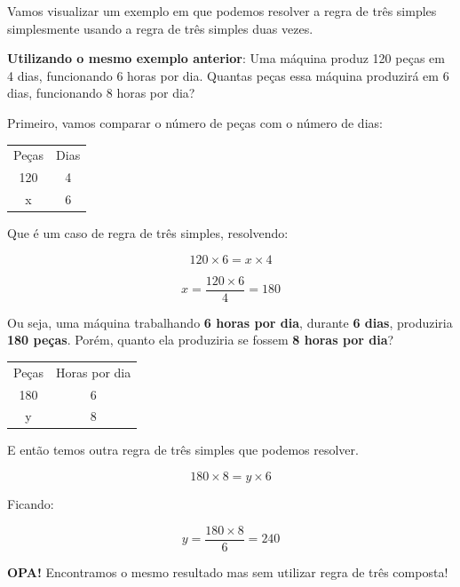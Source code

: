 Vamos visualizar um exemplo em que podemos resolver a regra de três simples simplesmente usando a regra de três simples duas vezes.

\begin{exemplo}
    \textbf{Utilizando o mesmo exemplo anterior}: Uma máquina produz 120 peças em 4 dias, funcionando 6 horas por dia. Quantas peças essa máquina produzirá em 6 dias, funcionando 8 horas por dia?

    \vspace{0.5cm} 

    Primeiro, vamos comparar o número de peças com o número de dias:

    \begin{table}[H]
        \centering
        \begin{tabular}{cc}
            Peças & Dias \\
            120 & 4\\
            x & 6
        \end{tabular}

    \end{table}

    Que é um caso de regra de três simples, resolvendo:

    \begin{equation}
        120\times6=x\times 4
    \end{equation}

    \begin{equation}
        x=\frac{120\times6}{4}=180
    \end{equation}

    Ou seja, uma máquina trabalhando \textbf{6 horas por dia}, durante \textbf{6 dias}, produziria \textbf{180 peças}. Porém, quanto ela produziria se fossem \textbf{8 horas por dia}?

    \begin{table}[H]
        \centering
        \begin{tabular}{cc}
             Peças & Horas por dia \\
             180 & 6 \\
             y & 8
        \end{tabular}

    \end{table}

    E então temos outra regra de três simples que podemos resolver.

    \begin{equation}
        180\times8=y\times6
    \end{equation}

    Ficando:

    \begin{equation}
        y=\frac{180\times8}{6}=240
    \end{equation}

    \textbf{OPA!} Encontramos o mesmo resultado mas sem utilizar regra de três composta!
\end{exemplo}

